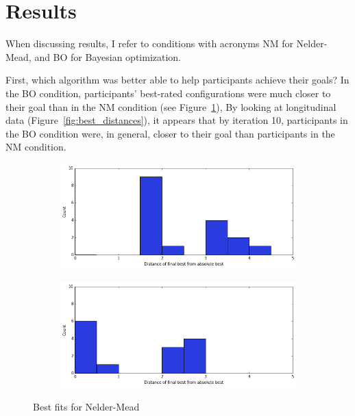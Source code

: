 \section{Results}

When discussing results, I refer to conditions with acronyms NM for Nelder-Mead, and BO for Bayesian optimization.

First, which algorithm was better able to help participants achieve their goals?
In the BO condition, participants' best-rated configurations were much closer to their goal than in the NM condition (see Figure~\ref{fig:bestfits}),
By looking at longitudinal data (Figure~\ref{fig:best_distances}), it appears that by iteration 10, participants in the BO condition were, in general, closer to their goal than participants in the NM condition.

\begin{figure}
  \centering
  \begin{subfigure}[b]{0.23\textwidth}
    \includegraphics[width=\textwidth]{figures/bestfits_nm}
  \end{subfigure}
  \begin{subfigure}[b]{0.23\textwidth}
    \includegraphics[width=\textwidth]{figures/bestfits_bo}
  \end{subfigure}
  \caption{Best fits for Nelder-Mead}\label{fig:bestfits}
\end{figure}

